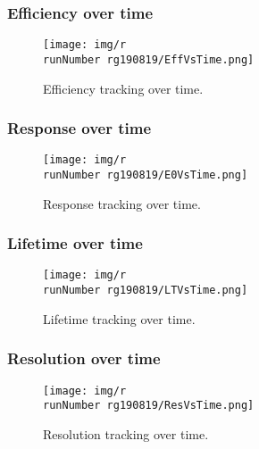\begin{frame}
\frametitle{Efficiency over time}
\begin{figure}
  \begin{center}
      \texttt{[image: img/r\\runNumber rg190819/EffVsTime.png]}
    \caption{Efficiency tracking over time.}
  \end{center}
\end{figure}
\end{frame}

\begin{frame}
\frametitle{Response over time}
\begin{figure}
  \begin{center}
      \texttt{[image: img/r\\runNumber rg190819/E0VsTime.png]}
    \caption{Response tracking over time.}
  \end{center}
\end{figure}
\end{frame}

\begin{frame}
\frametitle{Lifetime over time}
\begin{figure}
  \begin{center}
      \texttt{[image: img/r\\runNumber rg190819/LTVsTime.png]}
    \caption{Lifetime tracking over time.}
  \end{center}
\end{figure}
\end{frame}

\begin{frame}
\frametitle{Resolution over time}
\begin{figure}
  \begin{center}
      \texttt{[image: img/r\\runNumber rg190819/ResVsTime.png]}
    \caption{Resolution tracking over time.}
  \end{center}
\end{figure}
\end{frame}
